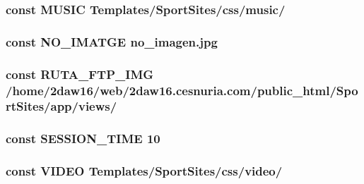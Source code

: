 \subsubsection[{M\+U\+S\+I\+C}]{\setlength{\rightskip}{0pt plus 5cm}const M\+U\+S\+I\+C \textquotesingle{}Templates/Sport\+Sites/css/music/\textquotesingle{}}\label{_config_8php_ab3669e89acae53a0fdcf3da518439b8e}
\hypertarget{_config_8php_ac568aefee1c511d54dbe03f7be516a91}{}
\subsubsection[{N\+O\+\_\+\+I\+M\+A\+T\+G\+E}]{\setlength{\rightskip}{0pt plus 5cm}const N\+O\+\_\+\+I\+M\+A\+T\+G\+E \textquotesingle{}no\+\_\+imagen.\+jpg\textquotesingle{}}\label{_config_8php_ac568aefee1c511d54dbe03f7be516a91}
\hypertarget{_config_8php_ab40a5165d5db4e95fa11a44bf620b467}{}
\subsubsection[{R\+U\+T\+A\+\_\+\+F\+T\+P\+\_\+\+I\+M\+G}]{\setlength{\rightskip}{0pt plus 5cm}const R\+U\+T\+A\+\_\+\+F\+T\+P\+\_\+\+I\+M\+G \textquotesingle{}/home/2daw16/web/2daw16.\+cesnuria.\+com/public\+\_\+html/\+Sport\+Sites/app/views/\textquotesingle{}}\label{_config_8php_ab40a5165d5db4e95fa11a44bf620b467}
\hypertarget{_config_8php_a7a117a7005f451700303761ecfb3e667}{}
\subsubsection[{S\+E\+S\+S\+I\+O\+N\+\_\+\+T\+I\+M\+E}]{\setlength{\rightskip}{0pt plus 5cm}const S\+E\+S\+S\+I\+O\+N\+\_\+\+T\+I\+M\+E 10}\label{_config_8php_a7a117a7005f451700303761ecfb3e667}
\hypertarget{_config_8php_a333a9b0a1034beea1b4b505f30885cea}{}
\subsubsection[{V\+I\+D\+E\+O}]{\setlength{\rightskip}{0pt plus 5cm}const V\+I\+D\+E\+O \textquotesingle{}Templates/Sport\+Sites/css/video/\textquotesingle{}}\label{_config_8php_a333a9b0a1034beea1b4b505f30885cea}
